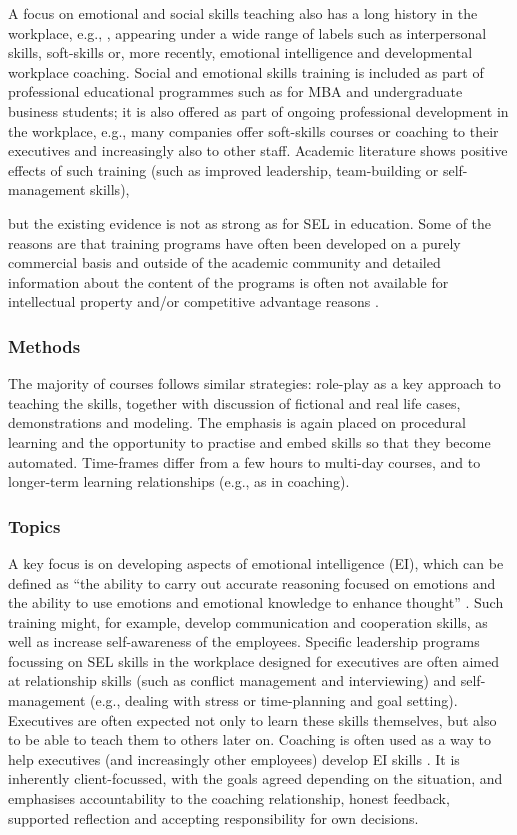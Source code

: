 \documentclass[prodmode,acmtochi]{acmsmall}
\newcommand{\GeraldineFIX}[1]{}
\begin{document}
A focus on emotional and social skills teaching also has a long history in the workplace, e.g.,  \cite{Bailey1983,Bailey1983a}, appearing under a wide range of labels such as interpersonal skills, soft-skills or, more recently, emotional intelligence and developmental workplace coaching. Social and emotional skills training is included as part of professional educational programmes such as for MBA and undergraduate business students; it is also offered as part of ongoing professional development in the workplace, e.g., many companies offer soft-skills courses or coaching to their executives and increasingly also to other staff. 
%
Academic literature shows positive effects of such training (such as improved leadership, team-building or self-management skills),
\GeraldineFIX{G: \textbf{(G:\ SUCH\ AS???)},} 
but the existing evidence is not as strong as for SEL in education. Some of the reasons are that training programs have often been developed on a purely commercial basis and outside of the academic community  and detailed information about the content of the programs is often not available for intellectual property and/or competitive advantage reasons \cite{Walter2011,Clarke2006,Riggio2003}. 




\subsubsection*{Methods} The majority of courses follows similar strategies: role-play as a key approach to teaching the skills, together with discussion of fictional and real life cases, demonstrations and modeling. The emphasis is again placed on procedural learning and the opportunity to practise and embed skills so that they become automated. Time-frames differ from a few hours to multi-day courses, and to longer-term learning relationships (e.g., as in coaching). 

\subsubsection*{Topics} 
        A key focus is on developing aspects of emotional intelligence (EI), which can be defined as ``the ability to carry out accurate reasoning focused on emotions and the ability to use emotions and emotional knowledge to enhance thought'' \cite{Mayer2008}. Such training might, for example, develop communication and cooperation skills, as well as increase self-awareness of the employees. 
%        
        Specific leadership programs focussing on SEL skills in the workplace designed for executives are often aimed at relationship skills (such as conflict management and interviewing) and self-management (e.g., dealing with stress or time-planning and goal setting). Executives are often expected not only to learn these skills themselves, but also to be able to teach them to others later on. Coaching is often used as a way to help executives (and increasingly other employees) develop EI skills \cite{Bono2009}. It is inherently client-focussed, with the goals agreed depending on the situation, and emphasises accountability to the coaching relationship, honest feedback, supported reflection and accepting responsibility for own decisions. 
\end{document}
